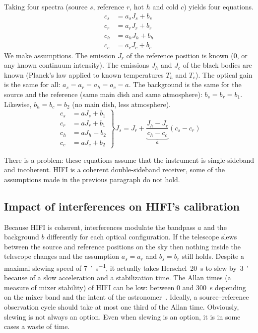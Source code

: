 Taking four spectra (source $s$, reference $r$, hot $h$ and cold $c$) yields four equations.
\begin{equation}
    \begin{aligned}
        c_s &= a_s J_s + b_s\\
        c_r &= a_r J_r + b_r\\
        c_h &= a_h J_h + b_h\\
        c_c &= a_c J_c + b_c
    \end{aligned}
\end{equation}
We make assumptions.
The emission $J_r$ of the reference position is known (0, or any known continuum intensity).
The emissions $J_h$ and $J_c$ of the black bodies are known (Planck's law applied to known temperatures $T_h$ and $T_c$).
The optical gain is the same for all: $a_s = a_r = a_h = a_c = a$.
The background is the same for the source and the reference (same main dish and same atmosphere): $b_s = b_r = b_1$.
Likewise, $b_h = b_c = b_2$ (no main dish, less atmosphere).
\begin{equation}
    \left.
    \begin{aligned}
        c_s &= a   J_s + b_1\\
        c_r &= a   J_r + b_1\\
        c_h &= a   J_h + b_2\\
        c_c &= a   J_c + b_2
    \end{aligned}
    \right\rbrace
    J_s = J_r +
    \underbrace{
        \frac{J_h - J_c}{c_h - c_c}
    }_{a}
    (c_s - c_r)
    \label{eq:ideal_calibration}
\end{equation}

There is a problem: these equations assume that the instrument is single-sideband and incoherent.
HIFI is a coherent double-sideband receiver, some of the assumptions made in the previous paragraph do not hold.

\subsection{Impact of interferences on HIFI's calibration}

Because HIFI is coherent, interferences modulate the bandpass $a$ and the background $b$ differently for each optical configuration.
If the telescope slews between the source and reference positions on the sky then nothing inside the telescope changes and the assumption $a_s=a_r$ and $b_s=b_r$ still holds.
Despite a maximal slewing speed of \SI{7}{\arcmin\per\second}, it actually takes Herschel~\SI{20}{\second} to slew by~\SI{3}{\arcmin} because of a slow acceleration and a stabilization time.
The Allan times (a measure of mixer stability) of HIFI can be low: between 0 and \SI{300}{\second} depending on the mixer band and the intent of the astronomer~\autocite{ossenkopf2008stability}.
Ideally, a source--reference observation cycle should take at most one third of the Allan time.
Obviously, slewing is not always an option.
Even when slewing is an option, it is in some cases a waste of time.

